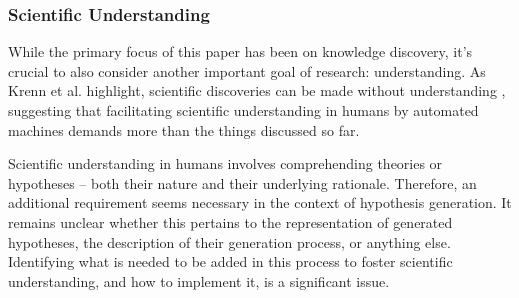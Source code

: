 



\subsubsection{Scientific Understanding}
While the primary focus of this paper has been on knowledge discovery, it's crucial to also consider another important goal of research: understanding. As Krenn et al. highlight, scientific discoveries can be made without understanding \cite{krenn2022scientific}, suggesting that facilitating scientific understanding in humans by automated machines demands more than the things discussed so far.

Scientific understanding in humans involves comprehending theories or hypotheses – both their nature and their underlying rationale. Therefore, an additional requirement seems necessary in the context of hypothesis generation. It remains unclear whether this pertains to the representation of generated hypotheses, the description of their generation process, or anything else. Identifying what is needed to be added in this process to foster scientific understanding, and how to implement it, is a significant issue.

